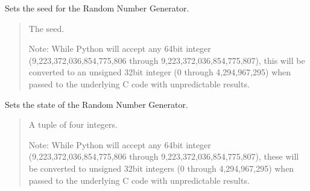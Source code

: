\documentclass[letterpaper,10pt,english]{sphinxmanual}
\begin{document}
\begin{fulllineitems}

\begin{fulllineitems}
\label{\detokenize{lysis.util:lysis.util.kiss.KissRandomGenerator.seed}}
\pysigstartsignatures
{}
\pysigstopsignatures
\sphinxAtStartPar
Sets the seed for the Random Number Generator.
\begin{quote}\begin{description}
\sphinxAtStartPar
{} \textendash{} 
\sphinxAtStartPar
The seed.

\sphinxAtStartPar
Note: While Python will accept any 64\sphinxhyphen{}bit integer
(\sphinxhyphen{}9,223,372,036,854,775,806 through 9,223,372,036,854,775,807),
this will be converted to an unsigned 32\sphinxhyphen{}bit integer (0 through
4,294,967,295) when passed to the underlying C code with
unpredictable results.


\end{description}\end{quote}

\end{fulllineitems}


\begin{fulllineitems}
\label{\detokenize{lysis.util:lysis.util.kiss.KissRandomGenerator.setstate}}
\pysigstartsignatures
{}
\pysigstopsignatures
\sphinxAtStartPar
Sets the state of the Random Number Generator.
\begin{quote}\begin{description}
\sphinxAtStartPar
{} \textendash{} 
\sphinxAtStartPar
A tuple of four integers.

\sphinxAtStartPar
Note: While Python will accept any 64\sphinxhyphen{}bit integer
(\sphinxhyphen{}9,223,372,036,854,775,806 through 9,223,372,036,854,775,807),
these will be converted to unsigned 32\sphinxhyphen{}bit integers (0 through
4,294,967,295) when passed to the underlying C code with
unpredictable results.


\end{description}\end{quote}

\end{fulllineitems}


\end{fulllineitems}
\end{document}
